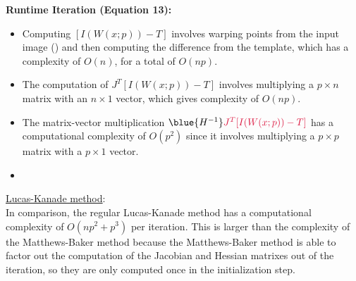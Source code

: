 \begin{problem}
\begin{answer}
\begin{enumarabic}
      \item \textbf{Runtime Iteration (Equation 13):}
        \begin{itemize}
          \item Computing $[I(W(x; p)) - T]$ involves warping points from the input image
              ()
              and then computing the difference from the template, which has a complexity of $O(n)$,
              for a total of $O(np)$.
          \item The computation of $J^T [I(W(x; p)) - T]$ involves multiplying a
            $p \times n$ matrix with an $n \times 1$ vector, which gives complexity of $O(n p)$.
          \item The matrix-vector multiplication $\blue{H^{-1}} \crim{J^T [I(W(x; p)) - T]}$
            has a computational complexity of $O(p^2)$ since it involves multiplying a
            $p \times p$ matrix with a $p \times 1$ vector.
          \item {}
        \end{itemize}
    \end{enumarabic}

    \step
    \underline{Lucas-Kanade method}: \\
    In comparison, the regular Lucas-Kanade method has a computational complexity of
    $O(np^2 + p^3)$ per iteration. This is larger than the complexity of the Matthews-Baker method
    because the Matthews-Baker method is able to factor out the computation of the Jacobian and
    Hessian matrixes out of the iteration, so they are only computed once in the initialization step.
  \end{answer}
\end{problem}
